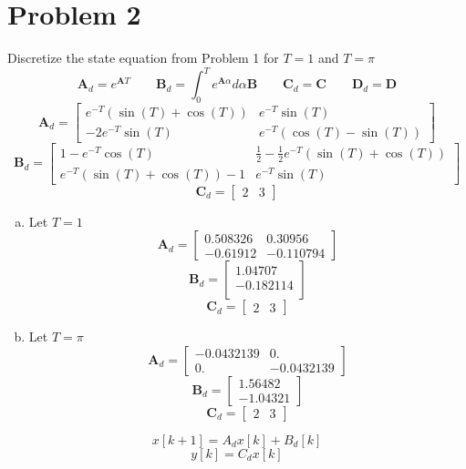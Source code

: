 \documentclass{article}
\begin{document}
\section*{Problem 2}
Discretize the state equation from Problem 1 for $T = 1$ and $T = \pi$
$$
\mathbf{A}_d = e^{\mathbf{A}T}
\qquad
\mathbf{B}_d = \int_0^Te^{\mathbf{A}\alpha}d\alpha\mathbf{B}
\qquad
\mathbf{C}_d = \mathbf{C}
\qquad
\mathbf{D}_d = \mathbf{D}
$$
$$
\mathbf{A}_d =
\begin{bmatrix}
e^{-T} (\sin (T)+\cos (T)) & e^{-T} \sin (T) \\
-2e^{-T} \sin (T) & e^{-T} (\cos (T)-\sin (T))
\end{bmatrix}
$$
$$
\mathbf{B}_d =
\begin{bmatrix}
1-e^{-T} \cos (T) & \frac{1}{2}-\frac{1}{2} e^{-T} (\sin (T)+\cos (T)) \\
e^{-T} (\sin (T)+\cos (T))-1 & e^{-T} \sin (T)
\end{bmatrix}
$$
$$
\mathbf{C}_d =
\begin{bmatrix}
2 & 3
\end{bmatrix}
$$
\begin{enumerate}[a)]
\item Let $T = 1$
$$
\mathbf{A}_d =
\begin{bmatrix}
 0.508326 & 0.30956 \\
-0.61912 & -0.110794
\end{bmatrix}
$$
$$
\mathbf{B}_d =
\begin{bmatrix}
 1.04707 \\
-0.182114 \\
\end{bmatrix}
$$
$$
\mathbf{C}_d =
\begin{bmatrix}
2 & 3
\end{bmatrix}
$$


\item Let $T = \pi$
$$
\mathbf{A}_d =
\begin{bmatrix}
-0.0432139 & 0. \\
 0. & -0.0432139
\end{bmatrix}
$$
$$
\mathbf{B}_d =
\begin{bmatrix}
 1.56482 \\
-1.04321
\end{bmatrix}
$$
$$
\mathbf{C}_d =
\begin{bmatrix}
2 & 3
\end{bmatrix}
$$
\end{enumerate}
$$ x[k+1] = A_dx[k]+B_d[k] $$
$$ y[k] = C_dx[k]$$
\end{document}
